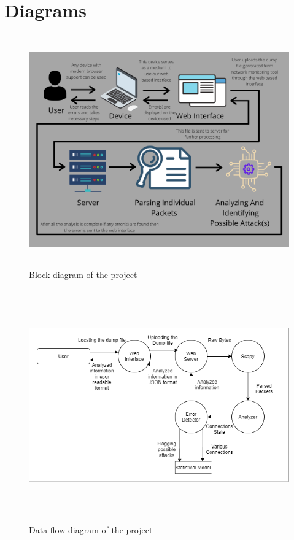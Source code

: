 \chapter{Diagrams}
{
	\begin{figure}[h]
		\includegraphics[width=\linewidth,height=10cm]{media/overview.png}
		\caption {Block diagram of the project}
	\end{figure}
	\begin{figure}[h]
		\includegraphics[width=\linewidth,height=10cm]{media/dfd.png}
		\caption {Data flow diagram of the project}
	\end{figure}
}